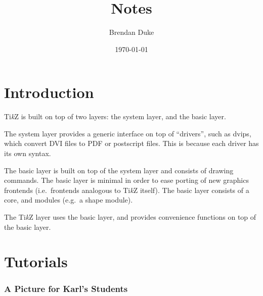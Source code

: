 \documentclass[a4paper, 12pt]{article}
\date{\today}
\title{\TikZ{} Notes}
\author{Brendan Duke}
\newcommand{\TikZ}{Ti\textit{k}Z}
\begin{document}
\maketitle

\part{Introduction}

\TikZ{} is built on top of two layers: the system layer, and the basic layer.

The system layer provides a generic interface on top of ``drivers'', such as
dvips, which convert DVI files to PDF or postscript files. This is because each
driver has its own syntax.

The basic layer is built on top of the system layer and consists of drawing
commands. The basic layer is minimal in order to ease porting of new graphics
frontends (i.e.\ frontends analogous to \TikZ{} itself). The basic layer
consists of a core, and modules (e.g.\ a shape module).

The \TikZ{} layer uses the basic layer, and provides convenience functions on
top of the basic layer.

\part{Tutorials}


\section{A Picture for Karl's Students}
\end{document}
